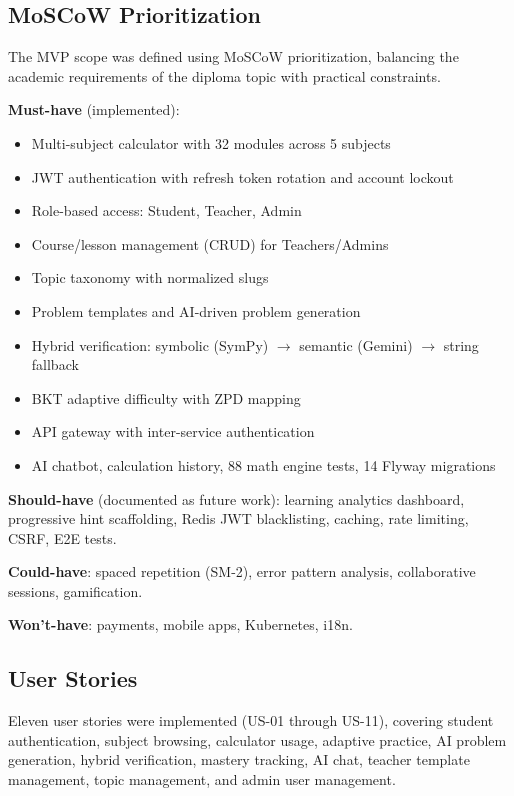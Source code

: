 \subsection{MoSCoW Prioritization}
\label{subsec:moscow}

The MVP scope was defined using MoSCoW prioritization, balancing the academic requirements of the diploma topic with practical constraints.

\textbf{Must-have} (implemented):
\begin{itemize}
  \item Multi-subject calculator with 32 modules across 5 subjects
  \item JWT authentication with refresh token rotation and account lockout
  \item Role-based access: Student, Teacher, Admin
  \item Course/lesson management (CRUD) for Teachers/Admins
  \item Topic taxonomy with normalized slugs
  \item Problem templates and AI-driven problem generation
  \item Hybrid verification: symbolic (SymPy) $\rightarrow$ semantic (Gemini) $\rightarrow$ string fallback
  \item BKT adaptive difficulty with ZPD mapping
  \item API gateway with inter-service authentication
  \item AI chatbot, calculation history, 88 math engine tests, 14 Flyway migrations
\end{itemize}

\textbf{Should-have} (documented as future work): learning analytics dashboard, progressive hint scaffolding, Redis JWT blacklisting, caching, rate limiting, CSRF, E2E tests.

\textbf{Could-have}: spaced repetition (SM-2), error pattern analysis, collaborative sessions, gamification.

\textbf{Won't-have}: payments, mobile apps, Kubernetes, i18n.

\subsection{User Stories}
\label{subsec:user-stories}

Eleven user stories were implemented (US-01 through US-11), covering student authentication, subject browsing, calculator usage, adaptive practice, AI problem generation, hybrid verification, mastery tracking, AI chat, teacher template management, topic management, and admin user management.


